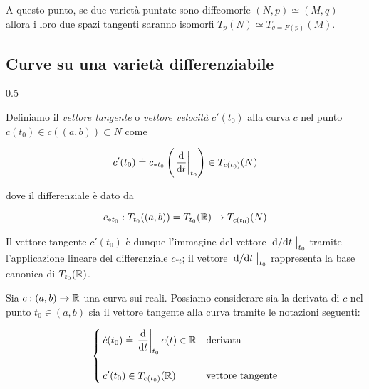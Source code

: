 A questo punto, se due varietà puntate sono diffeomorfe $ (N,p) \simeq (M,q) $ allora i loro due spazi tangenti saranno isomorfi $ T_{p}(N) \simeq T_{q=F(p)}(M) $.

\subsection{Curve su una varietà differenziabile}

	{0.5}{%
			}

Definiamo il \textit{vettore tangente} o \textit{vettore velocità} $ c'(t_{0}) $ alla curva $ c $ nel punto $ c(t_{0}) \in c((a,b)) \subset N $ come

\begin{equation}
	c'(t_{0}) \doteq c_{*t_{0}} \left( \eval{ \dv{t} }_{t_{0}} \right) \in T_{c(t_{0})}(N)
\end{equation}

dove il differenziale è dato da

\begin{equation}
	c_{*t_{0}} : T_{t_{0}}((a,b)) = T_{t_{0}}(\mathbb{R}) \to T_{c(t_{0})}(N)
\end{equation}

Il vettore tangente $ c'(t_{0}) $ è dunque l'immagine del vettore $ \eval{ \dv*{t} }_{t_{0}} $ tramite l'applicazione lineare del differenziale $ c_{*t} $; il vettore $ \eval{ \dv*{t} }_{t_{0}} $ rappresenta la base canonica di $ T_{t_{0}}(\mathbb{R}) $.

\begin{remark}
	Sia $ c : (a,b) \to \mathbb{R} $ una curva sui reali. Possiamo considerare sia la derivata di $ c $ nel punto $ t_{0} \in (a,b) $ sia il vettore tangente alla curva tramite le notazioni seguenti:
	
	\begin{equation}
		\begin{cases}
			\dot{c}(t_{0}) \doteq \eval{ \ddv{t} }_{t_{0}} c(t) \in \R & \text{derivata} \\ \\
			c'(t_{0}) \in T_{c(t_{0})}(\R) & \text{vettore tangente}
		\end{cases}
	\end{equation}
\end{remark}

